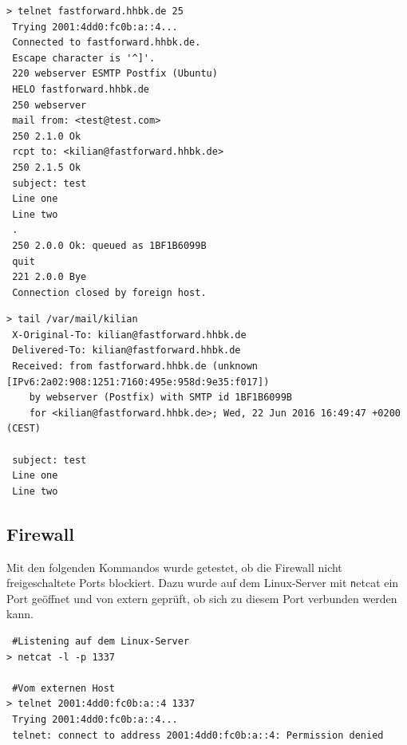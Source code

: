 \begin{lstlisting}[numbers=none]
> telnet fastforward.hhbk.de 25
 Trying 2001:4dd0:fc0b:a::4...
 Connected to fastforward.hhbk.de.
 Escape character is '^]'.
 220 webserver ESMTP Postfix (Ubuntu)
 HELO fastforward.hhbk.de
 250 webserver
 mail from: <test@test.com>
 250 2.1.0 Ok
 rcpt to: <kilian@fastforward.hhbk.de>
 250 2.1.5 Ok
 subject: test
 Line one
 Line two
 .
 250 2.0.0 Ok: queued as 1BF1B6099B
 quit
 221 2.0.0 Bye
 Connection closed by foreign host.
\end{lstlisting}

\begin{lstlisting}[numbers=none]
> tail /var/mail/kilian 
 X-Original-To: kilian@fastforward.hhbk.de
 Delivered-To: kilian@fastforward.hhbk.de
 Received: from fastforward.hhbk.de (unknown [IPv6:2a02:908:1251:7160:495e:958d:9e35:f017])
	by webserver (Postfix) with SMTP id 1BF1B6099B
	for <kilian@fastforward.hhbk.de>; Wed, 22 Jun 2016 16:49:47 +0200 (CEST)

 subject: test
 Line one
 Line two
\end{lstlisting}

\subsection{Firewall}

Mit den folgenden Kommandos wurde getestet, ob die Firewall nicht freigeschaltete Ports blockiert. Dazu wurde auf dem Linux-Server mit {\texttt netcat} ein Port geöffnet und von extern geprüft, ob sich zu diesem Port verbunden werden kann.

\begin{lstlisting}
 #Listening auf dem Linux-Server
> netcat -l -p 1337

 #Vom externen Host
> telnet 2001:4dd0:fc0b:a::4 1337
 Trying 2001:4dd0:fc0b:a::4...
 telnet: connect to address 2001:4dd0:fc0b:a::4: Permission denied
\end{lstlisting}
